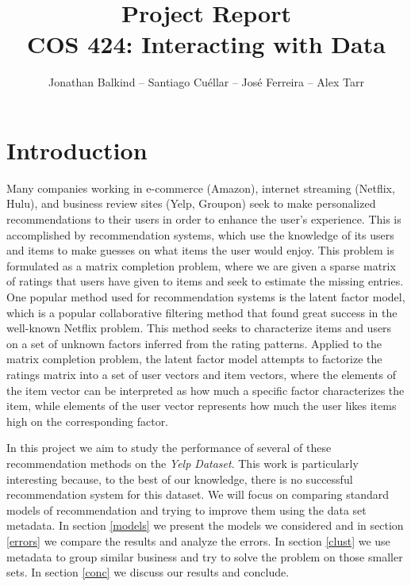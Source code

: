 \documentclass[12pt]{article}
\begin{document}
\title{Project Report \\ \vspace{5mm} \large{COS 424: Interacting with Data}}
\author{Jonathan Balkind -- Santiago Cu\'ellar -- Jos\'e Ferreira -- Alex Tarr} 
\maketitle


\section{Introduction} 
Many companies working in e-commerce (Amazon), internet streaming (Netflix, Hulu), and business review sites (Yelp, Groupon) seek 
to make personalized recommendations to their users in order to enhance the user's experience. This is accomplished by recommendation systems, 
which use the knowledge of its users and items to make guesses on what items the user would enjoy. This problem is formulated as a matrix completion 
problem, where we are given a sparse matrix of ratings that users have given to items and seek to estimate the missing entries.
	One popular method used for recommendation systems is the latent factor model, which is a popular collaborative filtering method that found great 
	success in the well-known Netflix problem. This method seeks to characterize items and users on a set of unknown factors inferred from the rating patterns. 
	Applied to the matrix completion problem, the latent factor model attempts to factorize the ratings matrix into a set 
	of user vectors and item vectors, where the elements of the item vector can be interpreted as how much a specific factor characterizes the item, while elements 
	of the user vector represents how much the user likes items high on the corresponding factor. 
	
In this project we aim to study the performance of several of these recommendation methods on the \emph{Yelp Dataset}. This work is particularly interesting because, to the best of our knowledge, there is no successful recommendation system for this dataset. We will focus on comparing standard models of recommendation and trying to improve them using the data set metadata. In section \ref{models} we present the models we considered and in section \ref{errors} we compare the results and analyze the errors. In section \ref{clust} we use metadata to group similar business and try to solve the problem on those smaller sets. In section \ref{conc} we discuss our results and conclude.
\end{document}
